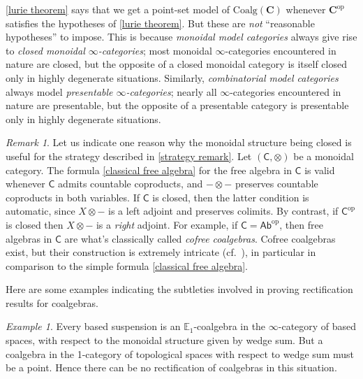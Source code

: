 \documentclass[a4paper,12pt]{amsart}
\theoremstyle{plain}
\theoremstyle{definition}
\theoremstyle{remark}
\newtheorem{remark}[theorem]{\sc Remark}%
\newtheorem{example}[theorem]{\sc Example}%
\begin{document}
\cref{lurie theorem} says %
that we get a point-set model of $\mathrm{Coalg}(\mathbf C)$ whenever $\mathbf C^{\mathrm{op}}$ satisfies the hypotheses of \cref{lurie theorem}. But these are \emph{not} ``reasonable hypotheses'' to impose. This is because \emph{monoidal model categories} always give rise to \emph{closed monoidal $\infty$-categories}; most monoidal $\infty$-categories encountered in nature are closed, but the opposite of a closed monoidal category is  itself closed only in highly degenerate situations.  Similarly, \emph{combinatorial model categories} always model \emph{presentable $\infty$-categories}; nearly all  $\infty$-categories encountered in nature are presentable, but the opposite of a presentable category is  presentable only in highly degenerate situations.



\begin{remark}\label{cofree are complicated}Let us indicate one reason why the monoidal structure being closed is useful for the strategy described in \cref{strategy remark}. Let $(\mathsf C,\otimes)$ be a monoidal category. The formula \eqref{classical free algebra} for the free algebra in $\mathsf C$ is valid whenever $\mathsf C$ admits countable coproducts, and $-\otimes-$ preserves countable coproducts in both variables. If $\mathsf C$ is closed, then the latter condition is automatic, since $X \otimes -$ is a left adjoint and preserves colimits. By contrast, if $\mathsf C^{\mathrm{op}}$ is closed then $X \otimes -$ is a \emph{right} adjoint. For example, if $\mathsf C = \mathsf{Ab}^{\mathrm{op}}$, then free algebras in $\mathsf C$ are what's classically called \emph{cofree coalgebras}. Cofree coalgebras exist, but their construction is extremely intricate (cf.~\cite{fox,Hazewinkel03}), in particular in comparison to the simple formula \eqref{classical free algebra}.

\end{remark}

Here are some examples indicating the subtleties involved in proving rectification results for coalgebras.

\begin{example}
    Every based suspension is an $\mathbb E_1$-coalgebra in the $\infty$-category of based spaces, with respect to the monoidal structure given by wedge sum. But a coalgebra in the 1-category of topological spaces with respect to wedge sum must be a point. Hence there can be no rectification of coalgebras in this situation.
\end{example}
\end{document}
